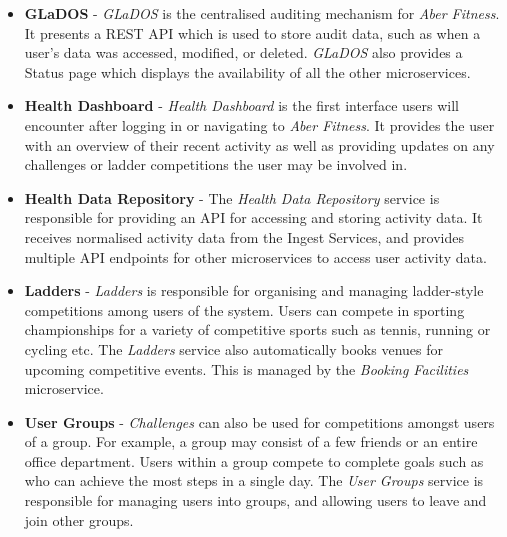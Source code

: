 \begin{itemize}
	\item \textbf{GLaDOS} - \textit{GLaDOS} is the centralised auditing mechanism for \textit{Aber Fitness}. It presents a REST API which is used to store audit data, such as when a user's data was accessed, modified, or deleted. \textit{GLaDOS} also provides a Status page which displays the availability of all the other microservices.

	\item \textbf{Health Dashboard} - \textit{Health Dashboard} is the first interface users will encounter after logging in or navigating to \textit{Aber Fitness}. It provides the user with an overview of their recent activity as well as providing updates on any challenges or ladder competitions the user may be involved in.

	\item \textbf{Health Data Repository} - The \textit{Health Data Repository} service is responsible for providing an API for accessing and storing activity data. It receives normalised activity data from the Ingest Services, and provides multiple API endpoints for other microservices to access user activity data. 

	\item \textbf{Ladders} - \textit{Ladders} is responsible for organising and managing ladder-style competitions among users of the system. Users can compete in sporting championships for a variety of competitive sports such as tennis, running or cycling etc. The \textit{Ladders} service also automatically books venues for upcoming competitive events. This is managed by the \textit{Booking Facilities} microservice.

	\item \textbf{User Groups} - \textit{Challenges} can also be used for competitions amongst users of a group. For example, a group may consist of a few friends or an entire office department. Users within a group compete to complete goals such as who can achieve the most steps in a single day. The \textit{User Groups} service is responsible for managing users into groups, and allowing users to leave and join other groups.

\end{itemize}